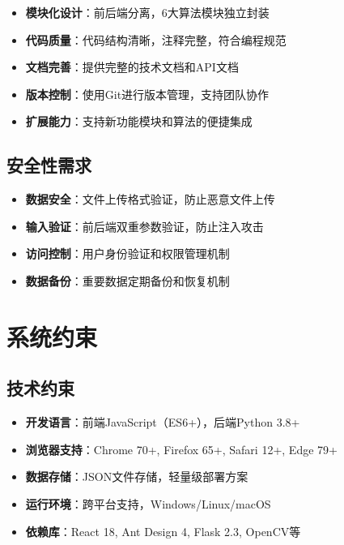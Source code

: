 \documentclass[12pt,a4paper]{article}
\begin{document}
\begin{warningbox}[title={系统维护要求}]
\begin{itemize}[nosep]
    \item \textbf{模块化设计}：前后端分离，6大算法模块独立封装
    \item \textbf{代码质量}：代码结构清晰，注释完整，符合编程规范
    \item \textbf{文档完善}：提供完整的技术文档和API文档
    \item \textbf{版本控制}：使用Git进行版本管理，支持团队协作
    \item \textbf{扩展能力}：支持新功能模块和算法的便捷集成
\end{itemize}
\end{warningbox}

\subsection{安全性需求}

\begin{itemize}
    \item \textbf{数据安全}：文件上传格式验证，防止恶意文件上传
    \item \textbf{输入验证}：前后端双重参数验证，防止注入攻击
    \item \textbf{访问控制}：用户身份验证和权限管理机制
    \item \textbf{数据备份}：重要数据定期备份和恢复机制
\end{itemize}

\section{系统约束}

\subsection{技术约束}

\begin{infobox}[title={技术环境约束}]
\begin{itemize}[nosep]
    \item \textbf{开发语言}：前端JavaScript（ES6+），后端Python 3.8+
    \item \textbf{浏览器支持}：Chrome 70+, Firefox 65+, Safari 12+, Edge 79+
    \item \textbf{数据存储}：JSON文件存储，轻量级部署方案
    \item \textbf{运行环境}：跨平台支持，Windows/Linux/macOS
    \item \textbf{依赖库}：React 18, Ant Design 4, Flask 2.3, OpenCV等
\end{itemize}
\end{infobox}
\end{document}
